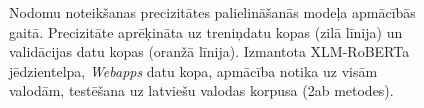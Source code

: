 \begin{figure}[h] 
   \centering
   \caption{Nodomu noteikšanas precizitātes palielināšanās modeļa apmācībās gaitā. Precizitāte aprēķināta uz treniņdatu kopas (zilā līnija) un validācijas datu kopas (oranžā līnija). Izmantota XLM-RoBERTa jēdzientelpa, \textit{Webapps} datu kopa, apmācība notika uz visām valodām, testēšana uz latviešu valodas korpusa (2ab metodes).} 
   \label{fig:webapps-xlm-all}
\end{figure}
